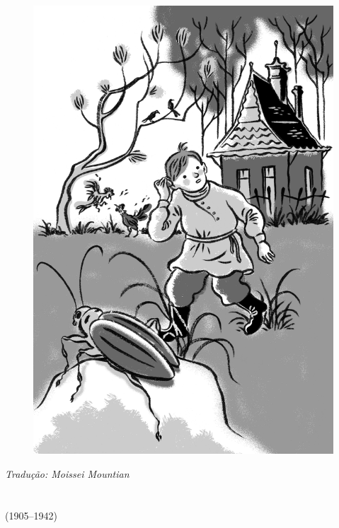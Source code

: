 \begin{figure}%
\vspace*{-1.6cm}
\hspace*{-2cm}\includegraphics[width=140mm]{./imgs/cena14.jpg}
\end{figure}

\medskip

{\footnotesize\hfill\emph{Tradução: Moissei Mountian}}


\chapter*{}
\label{part15}
\thispagestyle{empty}

\begin{vplace}[1.5]
{\HUGES\hfill{}}

{\LARGE\hfill\textlt(1905–1942)}
\end{vplace}

